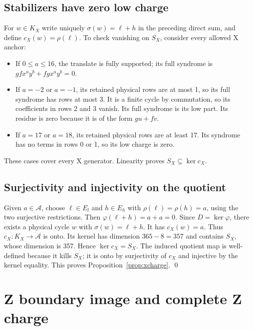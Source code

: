 \documentclass{article}
\begin{document}
\subsection{Stabilizers have zero low charge}\label{sec:x-stabilizers}

For \(w \in K_X\) write uniquely \(\sigma(w) = \ell + h\) in the preceding direct sum, and define
\(c_X(w) = \rho(\ell)\). To check vanishing on \(S_X\), consider every allowed X anchor:
\begin{itemize}
  \item If \(0 \le a \le 16\), the translate is fully supported; its full syndrome is
    \(gfx^a y^b + fgx^a y^b = 0\).
  \item If \(a = -2\) or \(a = -1\), its retained physical rows are at most 1, so its full
    syndrome has rows at most 3. It is a finite cycle by commutation, so its coefficients in rows
    2 and 3 vanish. Its full syndrome is its low part. Its residue is zero because it is of the
    form \(gu + fv\).
  \item If \(a = 17\) or \(a = 18\), its retained physical rows are at least 17. Its syndrome has
    no terms in rows 0 or 1, so its low charge is zero.
\end{itemize}
These cases cover every X generator. Linearity proves \(S_X \subseteq \ker c_X\).

\subsection{Surjectivity and injectivity on the quotient}\label{sec:x-quotient}

Given \(a \in \mathcal{A}\), choose \(\ell \in E_l\) and \(h \in E_h\) with
\(\rho(\ell) = \rho(h) = a\), using the two surjective restrictions. Then
\(\varphi(\ell + h) = a + a = 0\). Since \(D = \ker\varphi\), there exists a physical cycle \(w\)
with \(\sigma(w) = \ell + h\). It has \(c_X(w) = a\). Thus \(c_X \colon K_X \to \mathcal{A}\) is
onto. Its kernel has dimension \(365 - 8 = 357\) and contains \(S_X\), whose dimension is 357.
Hence \(\ker c_X = S_X\). The induced quotient map is well-defined because it kills \(S_X\); it
is onto by surjectivity of \(c_X\) and injective by the kernel equality. This proves
Proposition~\ref{prop:xcharge}. \qed

\section{Z boundary image and complete Z charge}\label{sec:zcharge}
\end{document}
